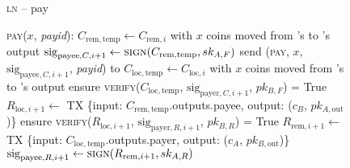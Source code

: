 \begin{figure}[H]
  \begin{processbox}{\textsc{ln} -- pay}
    \begin{algorithmic}[1]
      \State \textsc{pay}($x$, \textit{payid}):
      \Indent
        \State $C_{\mathrm{rem}, \mathrm{temp}} \gets C_{\mathrm{rem}, i}$ with
        $x$ coins moved from \alice's to \bob's output
        \State $\mathrm{sig}_{\mathrm{payee}, C, i+1} \gets
        \textsc{sign}(C_{\mathrm{rem}, \mathrm{temp}}, sk_{A, F})$ 
        \State send (\textsc{pay}, $x$, $\mathrm{sig}_{\mathrm{payee}, C, i+1}$,
        \textit{payid}) to \bob
        \State {}
        \State {}
        \State {}
        \State {}
        \State {}
        \State {}
        \State {}
        \State $C_{\mathrm{loc}, \mathrm{temp}} \gets C_{\mathrm{loc}, i}$ with
        $x$ coins moved from \alice's to \bob's output
        \State ensure \textsc{verify}($C_{\mathrm{loc}, \mathrm{temp}}$,
        $\mathrm{sig}_{\mathrm{payer}, C, i+1}$, $pk_{B, F}$) = True
        \State $R_{\mathrm{loc}, i+1} \gets$ TX \{input: $C_{\mathrm{rem},
        \mathrm{temp}}$.outputs.payee, output: ($c_B$, $pk_{A,
        \mathrm{out}}$)\}
        \State ensure \textsc{verify}($R_{\mathrm{loc}, i+1}$,
        $\mathrm{sig}_{\mathrm{payer}, R, i+1}$, $pk_{B, R}$) = True
        \State $R_{\mathrm{rem}, i+1} \gets$ TX \{input: $C_{\mathrm{loc},
        \mathrm{temp}}$.outputs.payer, output: ($c_A$, $pk_{B, \mathrm{out}}$)\}
        \State $\mathrm{sig}_{\mathrm{payee}, R, i+1} \gets
        \textsc{sign}(R_{\mathrm{rem}, i+1}, sk_{A, R})$

\end{algorithmic}
\end{processbox}
\end{figure}
